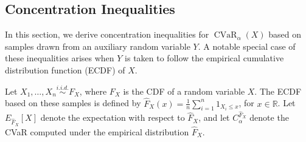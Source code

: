 \documentclass[acmlarge, manuscript, screen, review, natbib=false, oneside]{acmart}
\DeclareMathOperator{\CVaR}{CVaR}
\begin{document}
\subsection{Concentration Inequalities}\label{sec:con_ineq}
In this section, we derive concentration inequalities for $\CVaR_\alpha(X)$ based on samples drawn from an auxiliary random variable $Y$. A notable special case of these inequalities arises when $Y$ is taken to follow the empirical cumulative distribution function (ECDF) of $X$. 

Let $X_1, \ldots, X_n \overset{i.i.d.}{\sim} F_X$, where $F_X$ is the CDF of a random variable $X$. The ECDF based on these samples is defined by $\hat{F}_X(x)=\frac{1}{n} \sum_{i=1}^n 1_{X_i\leq x}$,
for $x\in \mathbb{R}$. Let $E_{\hat{F}_X}[X]$ denote the expectation with respect to $\hat{F}_X$, and let $C_\alpha^{\hat{F}_X}$ denote the CVaR computed under the empirical distribution $\hat{F}_X$.
\end{document}
